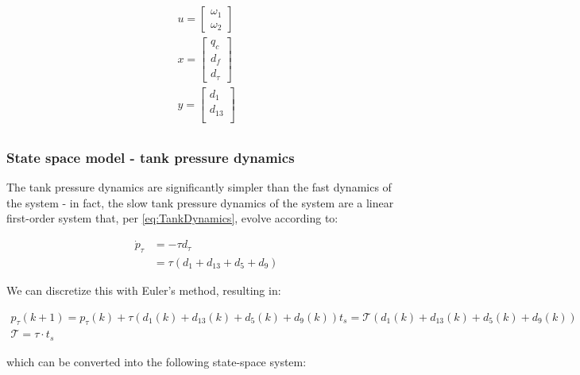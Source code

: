 \begin{equation}\label{eq:StateSpaceInputsOutputsFast}
	\begin{split}
		u = \begin{bmatrix} \omega_1 \\ \omega_2	\end{bmatrix} \\
		x = \begin{bmatrix} q_c \\ d_f \\ d_{\tau}	\end{bmatrix} \\
		y = \begin{bmatrix} d_1 \\ d_{13} \\ 	\end{bmatrix} \\
	\end{split}
\end{equation}

\subsubsection{State space model - tank pressure dynamics}
The tank pressure dynamics are significantly simpler than the fast dynamics of the system - in fact, the slow tank pressure dynamics of the system are a linear first-order system that, per \cref{eq:TankDynamics}, evolve according to:

\begin{equation}\label{eq:SlowTankDynamics}
	\begin{split}
		\dot{p}_\tau &= - \tau d_\tau \\
		&= \tau \left(d_1 + d_{13} + d_5 + d_9\right)
	\end{split}
\end{equation}

We can discretize this with Euler's method, resulting in:

\begin{equation}\label{eq:TankDynamicsDiscrete}
	\begin{gathered}
			p_\tau(k+1) = p_\tau(k) + \tau \left(d_1(k) + d_{13}(k) + d_5(k) + d_9(k)\right)t_s = \mathcal{T}\left(d_1(k) + d_{13}(k) + d_5(k) + d_9(k)\right) \\ 
			\mathcal{T} = \tau\cdot t_s 
	\end{gathered}
\end{equation}

which can be converted into the following state-space system:

